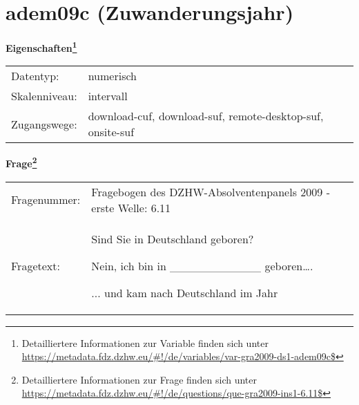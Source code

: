 
    \setcounter{footnote}{0}

    \vspace*{-1.8cm}
	\section{adem09c (Zuwanderungsjahr)}
	\label{section:adem09c}



    \vspace*{0.5cm}
    \noindent\textbf{Eigenschaften\footnote{Detailliertere Informationen zur Variable finden sich unter
		\url{https://metadata.fdz.dzhw.eu/\#!/de/variables/var-gra2009-ds1-adem09c$}}}\\
	\begin{tabularx}{\hsize}{@{}lX}
	Datentyp: & numerisch \\
	Skalenniveau: & intervall \\
	Zugangswege: &
	  download-cuf, 
	  download-suf, 
	  remote-desktop-suf, 
	  onsite-suf
 \\
    \end{tabularx}



				\vspace*{0.5cm}
                \noindent\textbf{Frage\footnote{Detailliertere Informationen zur Frage finden sich unter
		              \url{https://metadata.fdz.dzhw.eu/\#!/de/questions/que-gra2009-ins1-6.11$}}}\\
				\begin{tabularx}{\hsize}{@{}lX}
					Fragenummer: &
					  Fragebogen des DZHW-Absolventenpanels 2009 - erste Welle:
					  6.11
 \\
					Fragetext: & Sind Sie in Deutschland geboren?\par  Nein, ich bin in \_\_\_\_\_\_\_\_\_\_\_ geboren….\par  ... und kam nach Deutschland im Jahr \\
				\end{tabularx}





